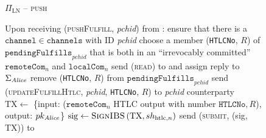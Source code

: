   \begin{figure}[H]
    \begin{protocolbox}{$\Pi_{\mathrm{LN}}$ -- \textsc{push}}
      \begin{algorithmic}[1]
        \State Upon receiving (\textsc{pushFulfill}, \textit{pchid}) from
        \environment:
        \label{alg:protocol:pushfulfill:start}
        \Indent
          \State ensure that there is a $\mathtt{channel} \in \mathtt{channels}$
          with ID \textit{pchid}
          \State choose a member (\texttt{HTLCNo}, $R$) of
          $\mathtt{pendingFulfills}_{\mathit{pchid}}$ that is both in an
          ``irrevocably committed'' $\mathtt{remoteCom}_n$ and
          $\mathtt{localCom}_n$
          \State send (\textsc{read}) to \ledger{} and assign reply to
          $\Sigma_{\mathit{Alice}}$
          \State remove (\texttt{HTLCNo}, $R$) from
          $\mathtt{pendingFulfills}_{\mathit{pchid}}$
            \State send (\textsc{updateFulfillHtlc}, \textit{pchid},
            \texttt{HTLCNo}, $R$) to \textit{pchid} counterparty
          \Else \ 
            \State $\mathrm{TX} \gets$ \{input: ($\mathtt{remoteCom}_n$ HTLC
            output with number $\mathtt{HTLCNo}, R$), output:
            $pk_{\mathit{Alice}}$\}
            \State $\mathrm{sig} \gets \textsc{SignIBS}\left(\mathrm{TX},
            sh_{\mathrm{htlc}, n}\right)$
            \State send (\textsc{submit}, (sig, TX)) to \ledger{}
            \label{alg:protocol:pushfulfill:submit}
          \EndIf
          \label{alg:protocol:pushfulfill:end}
        \EndIndent
        \Statex


\end{algorithmic}
\end{protocolbox}
\end{figure}
